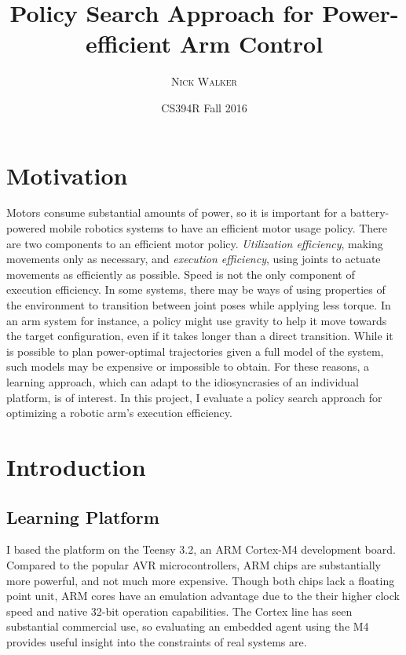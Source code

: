 \documentclass{article}
\title{Policy Search Approach for Power-efficient Arm Control}
\author{\textsc{Nick Walker}}
\date{CS394R Fall 2016} %
\begin{document}
	
\maketitle %


\section{Motivation}

Motors consume substantial amounts of power, so it is important for a battery-powered mobile robotics systems to have an efficient motor usage policy. There are two components to an efficient motor policy. \textit{Utilization efficiency}, making movements only as necessary, and \textit{execution efficiency}, using joints to actuate movements as efficiently as possible. Speed is not the only component of execution efficiency. In some systems, there may be ways of using properties of the environment to transition between joint poses while  applying less torque. In an arm system for instance, a policy might use gravity to help it move towards the target configuration, even if it takes longer than a direct transition. While it is possible to plan power-optimal trajectories given a full model of the system, such models may be expensive or impossible to obtain. For these reasons, a learning approach, which can adapt to the idiosyncrasies of an individual platform, is of interest. In this project, I evaluate a policy search approach for optimizing a robotic arm's execution efficiency.



\section{Introduction}

\subsection{Learning Platform}

I based the platform on the Teensy 3.2, an ARM Cortex-M4 development board. Compared to the popular AVR microcontrollers, ARM chips are substantially more powerful, and not much more expensive. Though both chips lack a floating point unit, ARM cores have an emulation advantage due to the their higher clock speed and native 32-bit operation capabilities. The Cortex line has seen substantial commercial use, so evaluating an embedded agent using the M4 provides useful insight into the constraints of real systems are.
\end{document}
